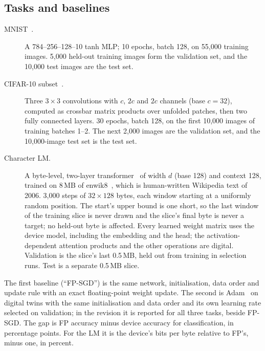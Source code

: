 \subsection{Tasks and baselines}\label{sec:tasks}
\begin{description}
\item[MNIST~\cite{lecun1998}.] A 784--256--128--10 tanh MLP; 10 epochs, batch 128, on 55{,}000 training images. 5{,}000 held-out
      training images form the validation set, and the 10{,}000 test images are the test set.
\item[CIFAR-10 subset~\cite{krizhevsky2009}.] Three $3\times3$ convolutions with $c$, $2c$ and $2c$ channels (base $c=32$),
      computed as crossbar matrix products over unfolded patches, then two fully connected layers. 30 epochs, batch 128, on the
      first 10{,}000 images of training batches 1--2. The next 2{,}000 images are the validation set, and the 10{,}000-image
      test set is the test set.
\item[Character LM.] A byte-level, two-layer transformer~\cite{vaswani2017} of width $d$ (base 128) and context 128, trained on
      8\,MB of enwik8~\cite{mahoney2011}, which is human-written Wikipedia text of 2006. 3{,}000 steps of $32\times128$ bytes, each window starting at a uniformly random position. The start's upper bound is
      one short, so the last window of the training slice is never drawn and the slice's final byte is
      never a target; no held-out byte is affected.
      Every learned weight matrix uses the device model, including the embedding and the head; the activation-dependent
      attention products and the other operations are digital. Validation is the slice's last 0.5\,MB, held out from
      training in selection runs. Test is a separate 0.5\,MB slice.
\end{description}
The first baseline (``FP-SGD'') is the same network, initialisation, data order and update rule with an exact floating-point
weight update. The second is Adam~\cite{kingma2014} on digital twins with the same initialisation and data order and its own
learning rate selected on validation; in the revision it is reported for all three tasks, beside FP-SGD. The gap is FP accuracy minus device
accuracy for classification, in percentage points. For the LM it is the device's bits per byte relative to FP's, minus one, in
percent.

